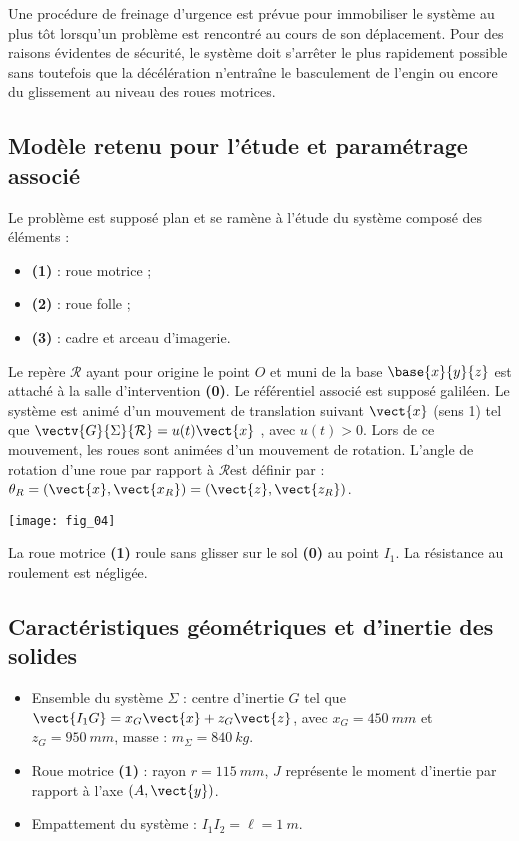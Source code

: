 \begin{multicols}{2}
Une procédure de freinage d’urgence est prévue pour immobiliser le système au plus tôt lorsqu’un
problème est rencontré au cours de son déplacement. Pour des raisons évidentes de sécurité, le système
doit s’arrêter le plus rapidement possible sans toutefois que la décélération n’entraîne le basculement
de l’engin ou encore du glissement au niveau des roues motrices.


\subsection*{Modèle retenu pour l’étude et paramétrage associé}

Le problème est supposé plan et se ramène à l’étude
du système composé des éléments :
\begin{itemize}
\item \textbf{(1)} : roue motrice ;
\item \textbf{(2)} : roue folle ;
\item \textbf{(3)} : cadre et arceau d’imagerie.
\end{itemize}
Le repère $\mathcal{R}$ ayant pour origine le point $O$ et muni de la
base $\base{x}{y}{z}$ est attaché à la salle d’intervention \textbf{(0)}.
Le référentiel associé est supposé galiléen.
Le système est animé d’un mouvement de translation
suivant $\vect{x}$ (sens 1) tel que $\vectv{G}{\Sigma}{\mathcal{R}}= u(t)\vect{x}$ , avec
$u(t) > 0$.
Lors de ce mouvement, les roues sont animées d’un
mouvement de rotation. L’angle de rotation d’une roue
par rapport à 
$\mathcal{R}$est définir par :
$\theta_R = \left(\vect{x},\vect{x_R}\right) = \left(\vect{z},\vect{z_R}\right)$.

\begin{center}
\texttt{[image: fig\_04]}
\end{center}



\begin{hypo}
La roue motrice \textbf{(1)} roule sans glisser sur le sol \textbf{(0)} au point $I_1$.
La résistance au roulement est négligée.
\end{hypo}

\subsection*{Caractéristiques géométriques et d’inertie des solides}
\begin{itemize}
\item Ensemble du système $\Sigma$ : centre d’inertie $G$ tel que $\vect{I_1G} = x_G \vect{x} +z_G \vect{z}$, avec $x_G=\SI{450}{mm}$ et $z_G=\SI{950}{mm}$, masse : $m_{\Sigma}=\SI{840}{kg}$.
\item Roue motrice \textbf{(1)} : rayon $r = \SI{115}{mm}$, $J$ représente le moment d’inertie par rapport à l’axe $\left(A,\vect{y}\right)$.
\item Empattement du système : $I_1I_2 =\ell  = \SI{1}{m}$.
\end{itemize}


\end{multicols}
